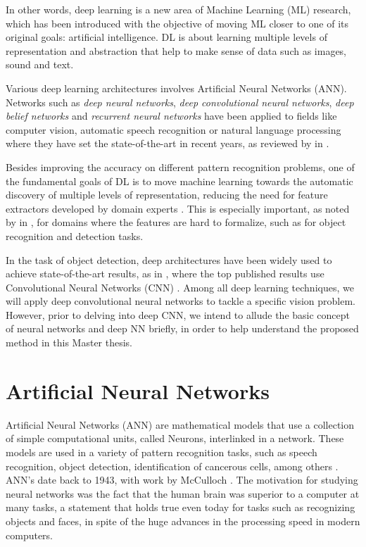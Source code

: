 In other words,  deep learning is a new area of Machine Learning (ML) research, which has been introduced with the objective of moving ML closer to one of its original goals: artificial intelligence. DL is about learning multiple levels of representation and abstraction that help to make sense of data such as images, sound and text.  

Various deep learning architectures involves Artificial Neural Networks (ANN). Networks such as \textit{deep neural networks}, \textit{deep convolutional neural networks},\textit{ deep belief networks} and \textit{recurrent neural networks} have been applied to fields like computer vision, automatic speech recognition or natural language processing where they have set the state-of-the-art in recent years, as reviewed by \citeauthor{bengio2009learning} in \cite{bengio2009learning, bengio2013deep}. 

Besides improving the accuracy on different pattern recognition problems, one of the fundamental goals of DL is to move machine learning towards the automatic discovery of multiple levels of representation, reducing the need for feature extractors developed by domain experts \cite{bengio2013deep}. This is especially important, as noted by \citeauthor{bengio2009learning} in \cite{bengio2009learning}, for domains where the features are hard to formalize, such as for object recognition and detection tasks.

In the task of object detection, deep architectures have been widely used to achieve state-of-the-art results, as in \cite{krizhevsky2012imagenet}, where the top published results use Convolutional Neural Networks (CNN) \cite{ciresan2012multi}. Among all deep learning techniques, we will apply deep convolutional neural networks to tackle a specific vision problem. However, prior to delving into deep CNN, we intend to allude the basic concept of neural networks and deep NN briefly, in order to help understand the proposed method in this Master thesis.

\section{Artificial Neural Networks}

Artificial Neural Networks (ANN) are mathematical models that use a collection of simple computational units, called Neurons, interlinked in a network. These models are used in a variety of pattern recognition tasks, such as speech recognition, object detection, identification of cancerous cells, among others \cite{hertz1991introduction}. ANN's date back to 1943, with work by McCulloch \cite{mcculloch1943logical}. The motivation for studying neural networks was the fact that the human brain was superior to a computer at many tasks, a statement that holds true even today for tasks such as recognizing objects and faces, in spite of the huge advances in the processing speed in modern computers.

